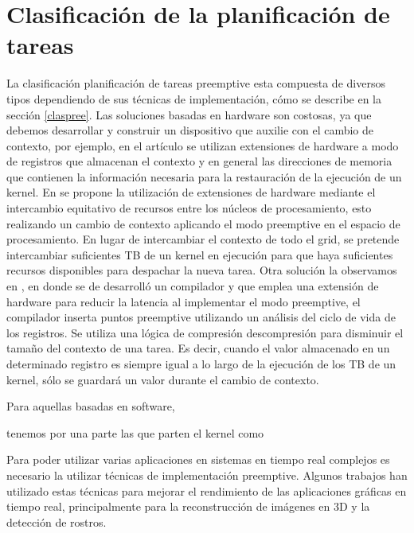 \section{Clasificación de la planificación de tareas}

La clasificación planificación de tareas preemptive esta compuesta de diversos tipos dependiendo de sus técnicas de implementación, cómo se describe en la sección \ref{claspree}. 
Las soluciones basadas en hardware son costosas, ya que debemos desarrollar y construir un dispositivo que auxilie con el cambio de contexto, por ejemplo, en el artículo \cite{18} se utilizan extensiones de hardware a modo de registros que almacenan el contexto y en general las direcciones de memoria que contienen la información necesaria para la restauración de la ejecución de un kernel. En \cite{20} se propone la utilización de extensiones de hardware mediante el intercambio equitativo de recursos entre los núcleos de procesamiento, esto realizando un cambio de contexto aplicando el modo preemptive en el espacio de procesamiento. En lugar de intercambiar el contexto de todo el grid, se pretende intercambiar suficientes TB de un kernel en ejecución para que haya suficientes recursos disponibles para despachar la nueva tarea. Otra solución la observamos en , en donde se de desarrolló un compilador y que emplea una extensión de hardware para reducir la latencia al implementar el modo preemptive, el compilador inserta puntos preemptive utilizando un análisis del ciclo de vida de los registros. Se utiliza una lógica de compresión descompresión para disminuir el tamaño del contexto de una tarea. Es decir, cuando el valor almacenado en un determinado registro es siempre igual a lo largo de la ejecución de los TB de un kernel, sólo se guardará un valor durante el cambio de contexto.

Para aquellas basadas en software, 

tenemos por una parte las que parten el kernel como

	Para poder utilizar varias aplicaciones en sistemas en tiempo real complejos es necesario la utilizar técnicas de implementación preemptive. Algunos trabajos han utilizado estas técnicas para mejorar el rendimiento de las aplicaciones gráficas en tiempo real, principalmente para la reconstrucción de imágenes en 3D y la detección de rostros.

\vspace{0.3cm}

